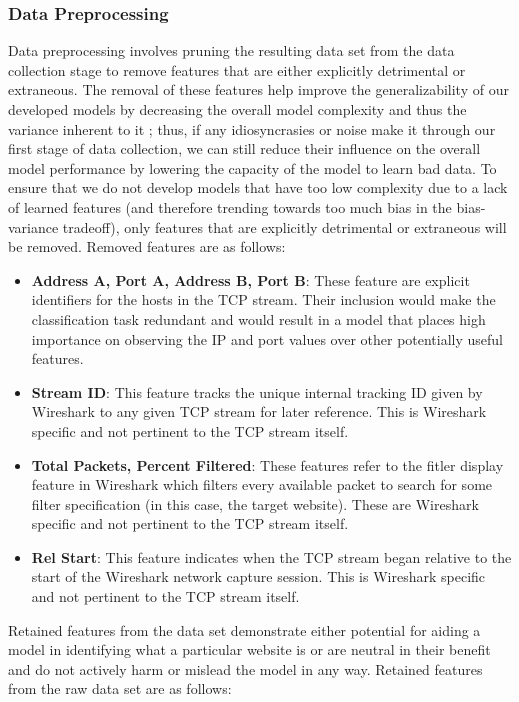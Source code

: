 \documentclass[10pt,sigconf,letterpaper,nonacm]{acmart}
\begin{document}
\subsubsection{Data Preprocessing}
Data preprocessing involves pruning the resulting data set from the data collection stage to remove features that are either explicitly detrimental or extraneous.
The removal of these features help improve the generalizability of our developed models by decreasing the overall model complexity and thus the variance inherent to it \cite{introInfo}; thus, if any idiosyncrasies or noise make it through our first stage of data collection, we can still reduce their influence on the overall model performance by lowering the capacity of the model to learn bad data.
To ensure that we do not develop models that have too low complexity due to a lack of learned features (and therefore trending towards too much bias in the bias-variance tradeoff), only features that are explicitly detrimental or extraneous will be removed.
Removed features are as follows:

\begin{itemize}
  \item \textbf{Address A, Port A, Address B, Port B}: These feature are explicit identifiers for the hosts in the TCP stream. Their inclusion would make the classification task redundant and would result in a model that places high importance on observing the IP and port values over other potentially useful features.
  
  \item \textbf{Stream ID}: This feature tracks the unique internal tracking ID given by Wireshark to any given TCP stream for later reference. This is Wireshark specific and not pertinent to the TCP stream itself.
  
  \item \textbf{Total Packets, Percent Filtered}: These features refer to the fitler display feature in Wireshark which filters every available packet to search for some filter specification (in this case, the target website). These are Wireshark specific and not pertinent to the TCP stream itself.
  
  \item \textbf{Rel Start}: This feature indicates when the TCP stream began relative to the start of the Wireshark network capture session. This is Wireshark specific and not pertinent to the TCP stream itself.
\end{itemize}

Retained features from the data set demonstrate either potential for aiding a model in identifying what a particular website is or are neutral in their benefit and do not actively harm or mislead the model in any way.
Retained features from the raw data set are as follows:
\end{document}
